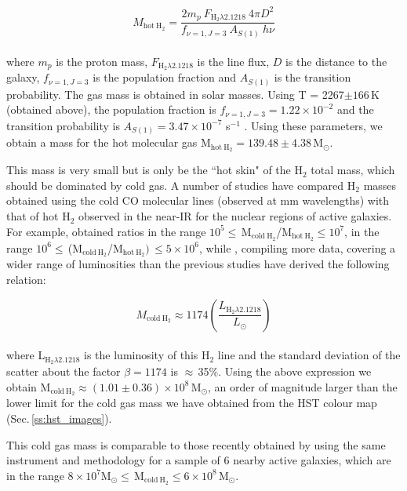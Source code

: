 \documentclass[fleqn,usenatbib]{mnras}
\begin{document}
\begin{equation}
    \label{eq:gas_hot}
    M_{\mathrm{hot\ H}_2} = \frac{2m_p\ F_{\mathrm{H}_2\lambda2.1218}\ 4\pi D^2}{f_{\nu=1,J=3}\ A_{S(1)}\ h\nu}
\end{equation}
\\
\noindent where $m_p$ is the proton mass, $F_{\mathrm{H}_2\lambda2.1218}$ is the line flux, $D$ is the distance to the galaxy, $f_{\nu=1,J=3}$ is the population fraction and $A_{S(1)}$ is the transition probability. The gas mass is obtained in solar masses. Using T = 2267$\pm166$\,K (obtained above), the population fraction is $f_{\nu=1,J=3} = 1.22 \times 10^{-2}$ and the transition probability is $A_{S(1)} = 3.47 \times 10^{-7}$ s$^{-1}$ \citep{turner_quadrupole_1977, scoville_velocity_1982, riffel_mapping_2008}. Using these parameters, we obtain a mass for the hot molecular gas M$_{\mathrm{hot\ H}_2}=139.48\pm4.38$\,M$_\odot$.

This mass is very small but is only be the ``hot skin" of the H$_2$ total mass, which should be dominated by cold gas. A number of studies have compared H$_2$ masses obtained using the cold CO molecular lines (observed at mm wavelengths) with that of hot H$_2$ observed in the near-IR for the nuclear regions of active galaxies. For example, \citet{dale_warm_2005} obtained ratios in the range $10^5\le$\,M$_{\mathrm{cold\ H}_2}$/M$_{\mathrm{hot\ H}_2}\le10^7$, \citet{muller_sanchez_sinfoni_2006} in the range $10^6\le$\,(M$_{\mathrm{cold\ H}_2}$/M$_{\mathrm{hot\ H}_2})\,\le5\times10^6$, while \citet{mazzalay_molecular_2013}, compiling more data, covering a wider range of luminosities than the previous studies have derived the following relation:

\begin{equation}
    \label{eq:gas_cold}
    M_{\mathrm{cold\ H}_2} \approx 1174 \left(\frac{L_{\mathrm{H}_2\lambda2.1218}}{L_\odot}\right)
\end{equation}
\\

\noindent where L$_{\mathrm{H}_2\lambda2.1218}$ is the luminosity of this H$_2$ line and the standard deviation of the scatter about the factor $\beta = 1174$ is $\approx$\,35\%. Using the above expression we obtain M$_{\mathrm{cold\ H}_2}\approx(1.01\pm0.36)\times10^8$\,M$_\odot$, an order of magnitude larger than the lower limit for the cold gas mass we have obtained from the HST colour map (Sec.\,\ref{ss:hst_images}).

This cold gas mass is comparable to those recently obtained by \citet{schonell_gemini_2019} using the same instrument and methodology for a sample of 6 nearby active galaxies, which are in the range $8\times10^7$M$_\odot\le$\,M$_{\mathrm{cold\ H}_2}\le6\times10^8$\,M$_\odot$.
\end{document}
